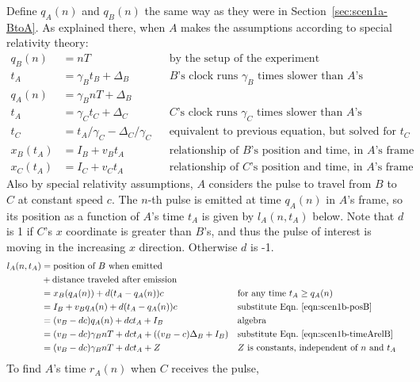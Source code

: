 \documentclass[a4paper]{article}
\theoremstyle{plain}
\theoremstyle{definition}
\begin{document}
Define $q_A(n)$ and $q_B(n)$ the same way as they were in
Section~\ref{sec:scen1a-BtoA}.  As explained there, when $A$ makes the
assumptions according to special relativity theory:
\begin{align}
q_B(n) & = nT & & \text{by the setup of the experiment} \nonumber \\
t_A & = \gamma_B t_B + \Delta_B & & \text{$B$'s clock runs $\gamma_B$ times slower than $A$'s} \nonumber \\
q_A(n) & = \gamma_B nT + \Delta_B \label{eqn:scen1b-timeArelB} \\
t_A & = \gamma_C t_C + \Delta_C & & \text{$C$'s clock runs $\gamma_C$ times slower than $A$'s} \nonumber \\
t_C & = t_A/\gamma_C - \Delta_C/\gamma_C & & \text{equivalent to previous equation, but solved for $t_C$} \label{eqn:scen1b-timeArelC} \\
x_B(t_A) & = I_B + v_B t_A & & \text{relationship of $B$'s position and time, in $A$'s frame} \label{eqn:scen1b-posB} \\
x_C(t_A) & = I_C + v_C t_A & & \text{relationship of $C$'s position and time, in $A$'s frame} \label{eqn:scen1b-posC}
\end{align}
Also by special relativity assumptions, $A$ considers the pulse to
travel from $B$ to $C$ at constant speed $c$.
The $n$-th pulse is emitted at time $q_A(n)$ in $A$'s frame,
so its position as a function of $A$'s time $t_A$ is given by
$l_A(n, t_A)$ below.
Note that $d$ is 1 if $C$'s $x$ coordinate is greater than $B$'s, and
thus the pulse of interest is moving in the increasing $x$
direction.  Otherwise $d$ is -1.
\begin{align*}
l_A(n, t_A)
  & = \text{position of $B$ when emitted} \\
  &   + \text{distance traveled after emission} \\
  & = x_B(q_A(n)) + d (t_A - q_A(n)) c & & \text{for any time $t_A \geq q_A(n)$} \\
  & = I_B + v_B q_A(n) + d (t_A - q_A(n)) c & & \text{substitute Eqn.~\eqref{eqn:scen1b-posB}} \\
  & = (v_B - dc) q_A(n) + dc t_A + I_B & & \text{algebra} \\
  & = (v_B - dc) \gamma_B nT + dc t_A + ((v_B-c)\Delta_B + I_B) & & \text{substitute Eqn.~\eqref{eqn:scen1b-timeArelB}} \\
  & = (v_B - dc) \gamma_B nT + dc t_A + Z & & \text{$Z$ is constants, independent of $n$ and $t_A$}
\end{align*}
To find $A$'s time $r_A(n)$ when $C$ receives the pulse,
\end{document}
